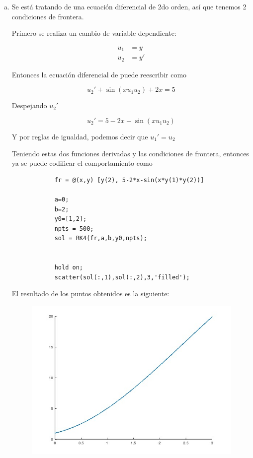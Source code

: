 \documentclass[a4paper, 12pt]{article}
\begin{document}
    \begin{enumerate}[a)]
        \item Se está tratando de una ecuación diferencial de 2do orden, así que tenemos 2 condiciones de frontera.
        
        Primero se realiza un cambio de variable dependiente:

        \begin{align*}
            u_1 &= y \\
            u_2 &= y'
        \end{align*}

        Entonces la ecuación diferencial de puede reescribir como

        \[
            u_2'+ \sin (x u_1 u_2) + 2x = 5
        \]

        Despejando $u_2'$

        \[
            u_2' = 5 - 2x - \sin (x u_1 u_2)
        \]

        Y por reglas de igualdad, podemos decir que $u_1' = u_2$

        Teniendo estas dos funciones derivadas y las condiciones de frontera, entonces ya se puede codificar el comportamiento como

        \begin{verbatim}
            fr = @(x,y) [y(2), 5-2*x-sin(x*y(1)*y(2))]

            a=0;
            b=2;
            y0=[1,2];
            npts = 500;
            sol = RK4(fr,a,b,y0,npts);


            hold on;
            scatter(sol(:,1),sol(:,2),3,'filled');
        \end{verbatim}

        El resultado de los puntos obtenidos es la siguiente:

        \begin{figure}[ht!]
            \centering
            \includegraphics[width=16cm]{img/e1a.jpeg}
        \end{figure}


\end{enumerate}
\end{document}
